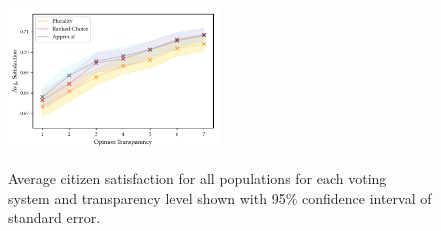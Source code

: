 \begin{figure}[h!]
\includegraphics[width=0.5\textwidth]{../src/figs/new/avghapp_transparency.pdf}
\label{fig:avghapp_by_transparency}
\caption{Average citizen satisfaction for all populations for each voting system and transparency level shown
    with 95\% confidence interval of standard error.}
\end{figure}
